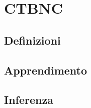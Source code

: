
\chapter{CTBNC}
\label{cap:ctbnc}

\lipsum[1]

\section{Definizioni}
\lipsum[2]

\section{Apprendimento}
\lipsum[3-4]

\section{Inferenza}
\lipsum[5-7]